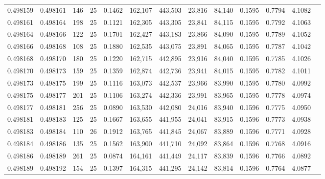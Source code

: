 \begin{tabular}{rrrrrrrrrrrrr}
0.498159 & 0.498161 & 146 &  25 &                                     0.1462 & 162,107 & 443,503 &  23,816 &  84,140 & 0.1595 & 0.7794 & 4.1082 \\
0.498161 & 0.498164 & 198 &  25 &                                     0.1121 & 162,305 & 443,305 &  23,841 &  84,115 & 0.1595 & 0.7792 & 4.1063 \\
0.498164 & 0.498166 & 122 &  25 &                                     0.1701 & 162,427 & 443,183 &  23,866 &  84,090 & 0.1595 & 0.7789 & 4.1052 \\
0.498166 & 0.498168 & 108 &  25 &                                     0.1880 & 162,535 & 443,075 &  23,891 &  84,065 & 0.1595 & 0.7787 & 4.1042 \\
0.498168 & 0.498170 & 180 &  25 &                                     0.1220 & 162,715 & 442,895 &  23,916 &  84,040 & 0.1595 & 0.7785 & 4.1026 \\
0.498170 & 0.498173 & 159 &  25 &                                     0.1359 & 162,874 & 442,736 &  23,941 &  84,015 & 0.1595 & 0.7782 & 4.1011 \\
0.498173 & 0.498175 & 199 &  25 &                                     0.1116 & 163,073 & 442,537 &  23,966 &  83,990 & 0.1595 & 0.7780 & 4.0992 \\
0.498175 & 0.498177 & 201 &  25 &                                     0.1106 & 163,274 & 442,336 &  23,991 &  83,965 & 0.1595 & 0.7778 & 4.0974 \\
0.498177 & 0.498181 & 256 &  25 &                                     0.0890 & 163,530 & 442,080 &  24,016 &  83,940 & 0.1596 & 0.7775 & 4.0950 \\
0.498181 & 0.498183 & 125 &  25 &                                     0.1667 & 163,655 & 441,955 &  24,041 &  83,915 & 0.1596 & 0.7773 & 4.0938 \\
0.498183 & 0.498184 & 110 &  26 &                                     0.1912 & 163,765 & 441,845 &  24,067 &  83,889 & 0.1596 & 0.7771 & 4.0928 \\
0.498184 & 0.498186 & 135 &  25 &                                     0.1562 & 163,900 & 441,710 &  24,092 &  83,864 & 0.1596 & 0.7768 & 4.0916 \\
0.498186 & 0.498189 & 261 &  25 &                                     0.0874 & 164,161 & 441,449 &  24,117 &  83,839 & 0.1596 & 0.7766 & 4.0892 \\
0.498189 & 0.498192 & 154 &  25 &                                     0.1397 & 164,315 & 441,295 &  24,142 &  83,814 & 0.1596 & 0.7764 & 4.0877 \\

\end{tabular}
